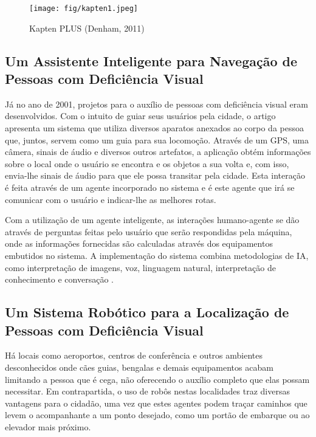 \begin{figure}[H]
\centering
\caption[Ferramenta Kapten PLUS]{\label{fig:fig2}Kapten PLUS (Denham, 2011)}
\texttt{[image: fig/kapten1.jpeg]}
\end{figure}


\subsection{Um Assistente Inteligente para Navegação de Pessoas com Deficiência Visual}
Já no ano de 2001, projetos para o auxílio de pessoas com deficiência visual eram desenvolvidos. Com o intuito de guiar seus usuários pela cidade, o artigo apresenta um sistema que utiliza diversos aparatos anexados ao corpo da pessoa que, juntos, servem como um guia para sua locomoção. Através de um GPS, uma câmera, sinais de áudio e diversos outros artefatos, a aplicação obtém informações sobre o local onde o usuário se encontra e os objetos a sua volta e, com isso, envia-lhe sinais de áudio para que ele possa transitar pela cidade. Esta interação é feita através de um agente incorporado no sistema e é este agente que irá se comunicar com o usuário e indicar-lhe as melhores rotas.

Com a utilização de um agente inteligente, as interações humano-agente se dão através de perguntas feitas pelo usuário que serão respondidas pela máquina, onde as informações fornecidas são calculadas através dos equipamentos embutidos no sistema. A implementação do sistema combina metodologias de IA, como interpretação de imagens, voz, linguagem natural, interpretação de conhecimento e conversação \cite{BOURBAKIS2001}.

\subsection{Um Sistema Robótico para a Localização de Pessoas com Deficiência Visual}
Há locais como aeroportos, centros de conferência e outros ambientes desconhecidos onde cães guias, bengalas e demais equipamentos acabam limitando a pessoa que é cega, não oferecendo o auxílio completo que elas possam necessitar. Em contrapartida, o uso de robôs nestas localidades traz diversas vantagens para o cidadão, uma vez que estes agentes podem traçar caminhos que levem o acompanhante a um ponto desejado, como um portão de embarque ou ao elevador mais próximo.

